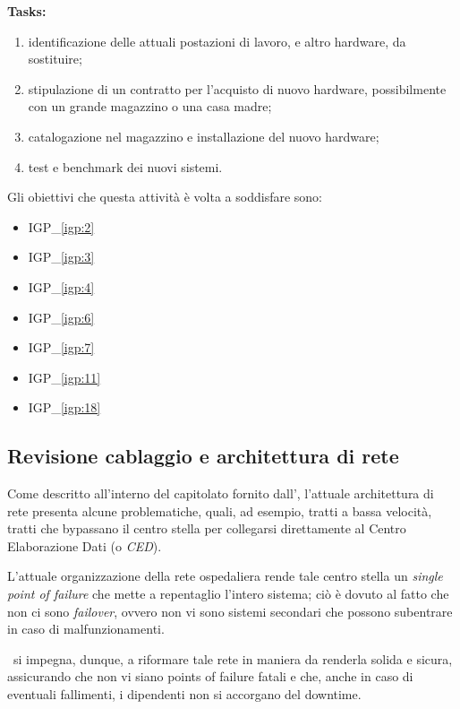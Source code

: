 		\textbf{Tasks:}
		\begin{enumerate}[noitemsep]
			\item identificazione delle attuali postazioni di lavoro, e altro hardware, da sostituire;
			\item stipulazione di un contratto per l'acquisto di nuovo hardware, possibilmente con un grande magazzino o una casa madre;
			\item catalogazione nel magazzino e installazione del nuovo hardware;
			\item test e benchmark dei nuovi sistemi.
		\end{enumerate}

		Gli obiettivi che questa attività è volta a soddisfare sono:
		\begin{itemize}[noitemsep]
			\renewcommand\labelitemi{--}
			\item {\color{pantone}IGP\_\ref{igp:2}}
			\item {\color{pantone}IGP\_\ref{igp:3}}
			\item {\color{pantone}IGP\_\ref{igp:4}}
			\item {\color{pantone}IGP\_\ref{igp:6}}
			\item {\color{pantone}IGP\_\ref{igp:7}}
			\item {\color{pantone}IGP\_\ref{igp:11}}
			\item {\color{pantone}IGP\_\ref{igp:18}}
		\end{itemize}

	\subsection{Revisione cablaggio e architettura di rete}\label{subsec:revisione_rete}
	
		Come descritto all'interno del capitolato fornito dall'\istituto, l'attuale architettura di rete presenta alcune problematiche, quali, ad esempio, tratti a bassa velocità, tratti che bypassano il centro stella per collegarsi direttamente al Centro Elaborazione Dati (o \textit{CED}).

		L'attuale organizzazione della rete ospedaliera rende tale centro stella un \textit{single point of failure} che mette a repentaglio l'intero sistema; ciò è dovuto al fatto che non ci sono \textit{failover}, ovvero non vi sono sistemi secondari che possono subentrare in caso di malfunzionamenti.
		
		\azienda~si impegna, dunque, a riformare tale rete in maniera da renderla solida e sicura, assicurando che non vi siano points of failure fatali e che, anche in caso di eventuali fallimenti, i dipendenti non si accorgano del downtime.
	
